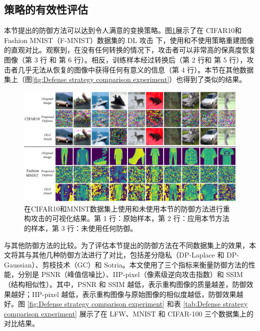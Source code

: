 \subsection{策略的有效性评估}

本节提出的防御方法可以达到令人满意的变换策略。图\ref{fig:CIFAR10 with ours in DLG}展示了在 CIFAR10\cite{cifar10}和Fashion MNIST（F-MNIST）\cite{Fashion-MNIST}数据集的 DL 攻击 \cite{DLG} 下，使用和不使用策略重建图像的直观对比。观察到，在没有任何转换的情况下，攻击者可以非常高的保真度恢复图像（第 3 行 和 第 6 行）。相反，训练样本经过转换后（第 2 行和 第 5 行），攻击者几乎无法从恢复的图像中获得任何有意义的信息（第 4 行）。本节在其他数据集上（图\ref{fig:Defense strategy comparison experiment}）也得到了类似的结果。

\begin{figure}[htb]
\centering
    \includegraphics[scale=0.5]{figures/chapter4/Comparative experiment of strategy effectiveness.jpg}
    \caption{在CIFAR10和MNIST数据集上使用和未使用本节的防御方法进行重构攻击的可视化结果。第 1 行：原始样本，第 2 行：应用本节方法的样本，第 3 行：未使用任何防御。}
    \label{fig:CIFAR10 with ours in DLG}
\end{figure}

与其他防御方法的比较。为了评估本节提出的防御方法在不同数据集上的效果，本文将其与其他几种防御方法进行了对比，包括差分隐私（DP-Laplace 和 DP-Gaussian）、剪枝技术（GC）和 Sotria。本文使用了三个指标来衡量防御方法的性能，分别是 PSNR（峰值信噪比）、IIP-pixel（像素级逆向攻击指数）和 SSIM（结构相似性）。其中，PSNR 和 SSIM 越低，表示重构图像的质量越差，防御效果越好；IIP-pixel 越低，表示重构图像与原始图像的相似度越低，防御效果越好。图 \ref{fig:Defense strategy comparison experiment} 和表 \ref{tab:Defense strategy comparison experiment} 展示了在 LFW、MNIST 和 CIFAR-100 三个数据集上的对比结果。

